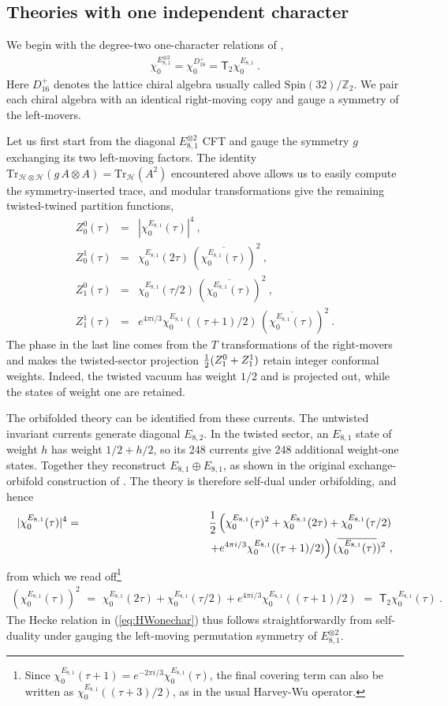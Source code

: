 \documentclass[12pt]{article}
\numberwithin{equation}{section}
\newcommand{\bea}{\begin{eqnarray}}
\newcommand{\eea}{\end{eqnarray}}
\def\no{\nonumber}
\def\ZZ{\mathbb{Z}}
\def\cH{\mathcal{H}}
\newcommand{\Tr}{\mathrm{Tr}}
\theoremstyle{remark}
\begin{document}
\subsection{Theories with one independent character}

We begin with the degree-two one-character relations of \cite{Harvey:2018rdc},
\bea
\label{eq:HWonechar}
\chi^{E_{8,1}^{\otimes2}}_0=\chi^{D_{16}^{+}}_0=\mathsf T_2\chi^{E_{8,1}}_0~.
\eea
Here $D_{16}^{+}$ denotes the lattice chiral algebra usually called $\mathrm{Spin}(32)/\ZZ_2$. We pair each chiral algebra with an identical right-moving copy and gauge a symmetry of the left-movers. 

Let us first start from the diagonal $E_{8,1}^{\otimes2}$ CFT and gauge the symmetry $g$ exchanging its two left-moving factors. The identity $\Tr_{\cH\otimes\cH}(g\,A\otimes A)=\Tr_{\cH}(A^2)$ encountered above allows us to easily compute the symmetry-inserted trace, and modular transformations give the remaining twisted-twined partition functions,
\bea
Z^0_0(\tau)&=&|\chi^{E_{8,1}}_0(\tau)|^4~,\no\\
Z^1_0(\tau)&=&\chi^{E_{8,1}}_0(2\tau) \,(\overline{\chi^{E_{8,1}}_0(\tau) })^2 ~,\no\\
Z^0_1(\tau)&=&\chi^{E_{8,1}}_0(\tau/2)\,(\overline{\chi^{E_{8,1}}_0(\tau) })^2 ~,\no\\
Z^1_1(\tau)&=&e^{4\pi i/3}\chi^{E_{8,1}}_0((\tau+1)/2)\,(\overline{\chi^{E_{8,1}}_0(\tau) })^2 ~.
\eea
The phase in the last line comes from the $T$ transformations of the right-movers and makes the twisted-sector projection ${1\over2}(Z^0_1+Z^1_1)$ retain integer conformal weights. Indeed, the twisted vacuum has weight $1/2$ and is projected out, while the states of weight one are retained.

The orbifolded theory can be identified from these currents. The untwisted invariant currents generate diagonal $E_{8,2}$. In the twisted sector, an $E_{8,1}$ state of weight $h$ has weight $1/2+h/2$, so its 248 currents give 248 additional weight-one states. Together they reconstruct $E_{8,1}\oplus E_{8,1}$, as shown in the original exchange-orbifold construction of \cite{Forgacs:1988iw}. The theory is therefore self-dual under orbifolding, and hence
\bea
|\chi^{E_{8,1}}_0(\tau)|^4 &=& {1\over 2} \left(\chi^{E_{8,1}}_0(\tau)^2 + \chi^{E_{8,1}}_0(2\tau)+\chi^{E_{8,1}}_0(\tau/2)\right. 
\\
&\vphantom{.}& \hspace{1.5in}\left. +e^{4\pi i/3}\chi^{E_{8,1}}_0((\tau+1)/2) \right) (\overline{\chi^{E_{8,1}}_0(\tau) })^2~,\no
\eea
from which we read off\footnote{Since $\chi^{E_{8,1}}_0(\tau+1)=e^{-2\pi i/3}\chi^{E_{8,1}}_0(\tau)$, the final covering term can also be written as $\chi^{E_{8,1}}_0((\tau+3)/2)$, as in the usual Harvey-Wu operator.}
\bea
\left(\chi^{E_{8,1}}_0(\tau)\right)^2\,\,=\,\,\chi^{E_{8,1}}_0(2\tau)+\chi^{E_{8,1}}_0(\tau/2)+e^{4\pi i/3}\chi^{E_{8,1}}_0((\tau+1)/2) \,\,=\,\, \mathsf T_2\chi^{E_{8,1}}_0(\tau)~.
\eea
The Hecke relation in (\ref{eq:HWonechar}) thus follows straightforwardly from self-duality under gauging the left-moving permutation symmetry of $E_{8,1}^{\otimes2}$.  
\end{document}
